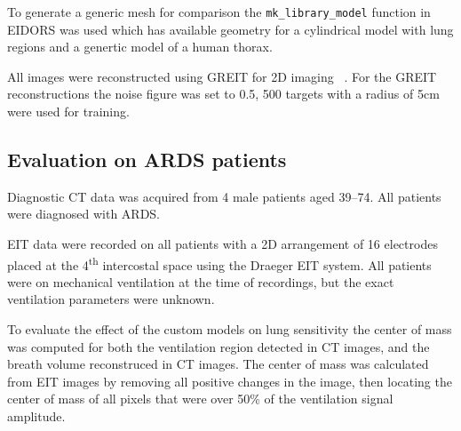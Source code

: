 To generate a generic mesh for comparison the \verb!mk_library_model! function in 
EIDORS was used which has available geometry for a cylindrical model with lung regions
and a genertic model of a human thorax.

All images were reconstructed using GREIT for 2D
imaging ~\parencite{adler_greit_2009}. For the GREIT 
reconstructions the noise figure was set to 0.5, 
500 targets with a radius of 5cm were used for training.

\subsection{Evaluation on ARDS patients} \label{sec:gi-scores}

Diagnostic CT data was acquired from 4 male patients aged 39--74. 
All patients were diagnosed with ARDS.

EIT data were recorded on all patients
with a 2D arrangement of 16 electrodes placed at the 
4\textsuperscript{th} intercostal space using the 
Draeger EIT system. 
All patients were on mechanical ventilation
at the time of recordings, but the exact 
ventilation parameters were unknown.

To evaluate the effect of the custom models on lung sensitivity 
the center of mass was computed for both the ventilation region detected in 
CT images, and the breath volume reconstruced in CT images. 
The center of mass was calculated from EIT images by removing all 
positive changes in the image, then locating the center of mass 
of all pixels that were over 50\% of the ventilation signal amplitude. 

%

